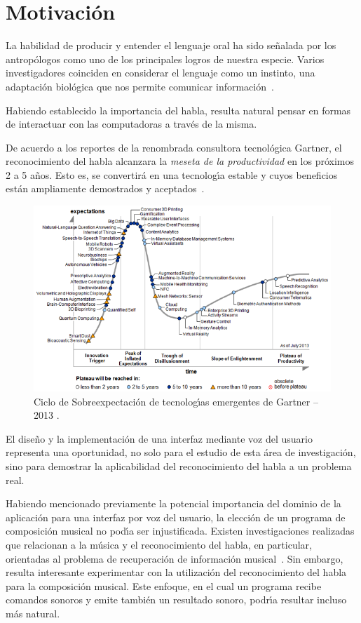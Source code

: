 \section{Motivaci\'on}
\label{sec:motivacion}

La habilidad de producir y entender el lenguaje oral ha sido se\~nalada por los antrop\'ologos
como uno de los principales logros de nuestra especie. Varios investigadores coinciden
en considerar el lenguaje como un instinto, una adaptaci\'on biol\'ogica que nos permite
comunicar \mbox{informaci\'on \cite{GabrielVoice2007}}.

Habiendo establecido la importancia del habla, resulta natural pensar en formas de
interactuar con las computadoras a trav\'es de la misma.

De acuerdo a los reportes de la renombrada consultora tecnol\'ogica Gartner, el reconocimiento
del habla alcanzara la  \emph{meseta de la productividad} en los pr\'oximos 2 a 5 a\~nos. Esto es,
se convertir\'a en una tecnolog{\'\i}a estable y cuyos beneficios est\'an ampliamente demostrados
y \mbox{aceptados \cite{Gartner2013}}.

\begin{figure}[ht]
\centering
\includegraphics[width=0.8\linewidth]{./graphics/gartner.png}
\caption{Ciclo de Sobreexpectaci\'on de tecnolog{\'\i}as emergentes de Gartner -- 2013 \cite{Gartner2013}.}
\label{figure:gartner}
\end{figure}

El dise\~no y la implementaci\'on de una interfaz mediante voz del usuario representa
una oportunidad, no solo para el estudio de esta \'area de investigaci\'on, sino para
demostrar la aplicabilidad del reconocimiento del habla a un problema real.

Habiendo mencionado previamente la potencial importancia del dominio de la aplicaci\'on
para una interfaz por voz del usuario, la elecci\'on de un programa de composici\'on musical
no pod{\'\i}a ser injustificada.
Existen investigaciones realizadas que relacionan a la m\'usica y el reconocimiento
del habla, en particular, orientadas al problema de recuperaci\'on de informaci\'on
\mbox{musical \cite{Goto2004Speech, Schuller2003Hybrid}}.
Sin embargo, resulta interesante experimentar con la utilizaci\'on del reconocimiento
del habla para la composici\'on musical. Este enfoque, en el cual un programa recibe comandos
sonoros y emite tambi\'en un resultado sonoro, podr{\'\i}a resultar incluso m\'as natural.

